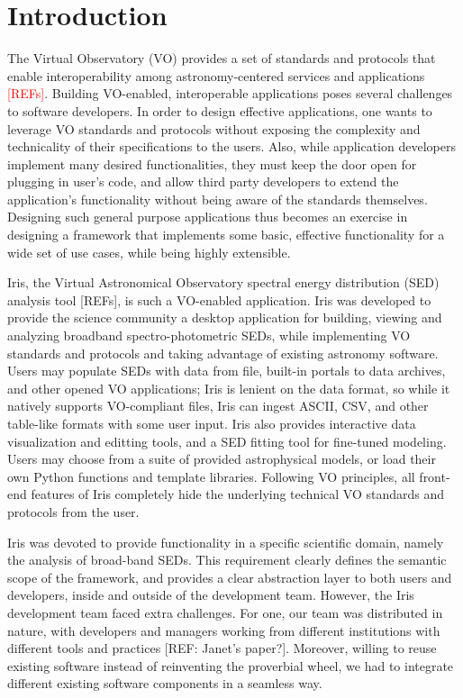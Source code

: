 \label{sec:introduction}
\section{Introduction} 
The Virtual Observatory (VO) provides a set of standards and protocols that enable interoperability among astronomy-centered services and applications \textcolor{red}{[REFs]}. Building VO-enabled, interoperable applications poses several challenges to software developers. In order to design effective applications, one wants to leverage VO standards and protocols without exposing the complexity and technicality of their specifications to the users. Also, while application developers implement many desired functionalities, they must keep the door open for plugging in user's code, and allow third party developers to extend the application's functionality without being aware of the standards themselves. Designing such general purpose applications thus becomes an exercise in designing a framework that implements some basic, effective functionality for a wide set of use cases, while being highly extensible.

Iris, the Virtual Astronomical Observatory spectral energy distribution (SED) analysis tool [REFs], is such a VO-enabled application. Iris was developed to provide the science community a desktop application for building, viewing and analyzing broadband spectro-photometric SEDs, while implementing VO standards and protocols and taking advantage of existing astronomy software. Users may populate SEDs with data from file, built-in portals to data archives, and other opened VO applications; Iris is lenient on the data format, so while it natively supports VO-compliant files, Iris can ingest ASCII, CSV, and other table-like formats with some user input. Iris also provides interactive data visualization and editting tools, and a SED fitting tool for fine-tuned modeling. Users may choose from a suite of provided astrophysical models, or load their own Python functions and template libraries. Following VO principles, all front-end features of Iris completely hide the underlying technical VO standards and protocols from the user.

Iris was devoted to provide functionality in a specific scientific domain, namely the analysis of broad-band SEDs. This requirement clearly defines the semantic scope of the framework, and provides a clear abstraction layer to both users and developers, inside and outside of the development team. However, the Iris development team faced extra challenges. For one, our team was distributed in nature, with developers and managers working from different institutions with different tools and practices [REF: Janet's paper?]. Moreover, willing to reuse existing software instead of reinventing the proverbial wheel, we had to integrate different existing software components in a seamless way.

